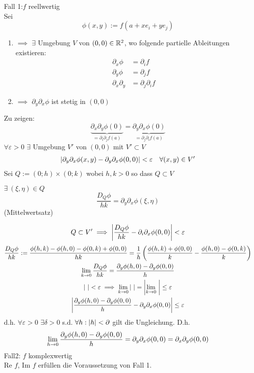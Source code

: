 \begin{Bew}
  Fall 1:$f$ reellwertig\\
  Sei 
  \[\phi(x,y):=f(a+xe_i+ye_j)\]
  \begin{enumerate}
    \item $\implies$ $\exists$ Umgebung $V$ von $(0,0)\in\mathbb{R}^2$, wo folgende partielle Ableitungen existieren:
      \begin{align*}
        \partial_x\phi&=\partial_if\\
        \partial_y\phi&=\partial_jf\\
        \partial_x\partial_y&=\partial_j\partial_if
      \end{align*}
    \item $\implies$ $\partial_y\partial_x\phi$ ist stetig in $(0,0)$
  \end{enumerate}
  Zu zeigen:
  \[\underbrace{\partial_x\partial_y\phi(0)}_{=\partial_i\partial_jf(a)}=\underbrace{\partial_y\partial_x\phi(0)}_{=\partial_j\partial_if(a)}\]
  $\forall \varepsilon >0$ $\exists$ Umgebung $V'$ von $(0,0)$ mit $V'\subset V$
  \begin{align*}
    \left| \partial_y\partial_x\phi(x,y)-\partial_y\partial_x\phi(0,0) \right|<\varepsilon &&\forall (x,y)\in V'
  \end{align*}
  Sei $Q:=\left( 0;h \right)\times\left( 0;k \right)$ wobei $h,k>0$ so dass $Q\subset V$
  \begin{Lem}
    $\exists\ (\xi,\eta)\in Q$
    \[\frac{D_Q\phi}{hk}=\partial_y\partial_x\phi(\xi,\eta)\]
    (Mittelwertsatz)
  \end{Lem}
  \begin{gather*}
    Q\subset V'\implies\left| \frac{D_Q\phi}{hk}-\partial_i\partial_x\phi(0,0) \right|<\varepsilon
  \end{gather*}
  \begin{gather*}
    \frac{D_Q\phi}{hk}:=\frac{\phi(h,k)-\phi(h,0)-\phi(0,k)+\phi(0,0)}{hk}=\frac{1}{h}\left( \frac{ \phi(h,k)+\phi(0,0)}{k}-\frac{\phi(h,0)-\phi(0,k)}{k}\right)\\
    \displaystyle\lim_{k\rightarrow0}\frac{D_Q\phi}{hk}=\frac{\partial_y\phi(h,0)-\partial_y\phi(0,0)}{h}\\
    \left| \  \right|<\varepsilon\implies\displaystyle\lim_{k\rightarrow0}\left| \  \right|=\left| \displaystyle\lim_{k\rightarrow0}\  \right|\leq \varepsilon\\
    \left| \frac{\partial_y\phi(h,0)-\partial_y\phi(0,0)}{h}-\partial_y\partial_x\phi(0,0) \right|\leq \varepsilon
  \end{gather*}
  d.h. $\forall\varepsilon>0$ $\exists \delta>0$ s.d. $\forall h:\left| h \right|<\partial$ gilt die Ungleichung. D.h.
  \[\displaystyle\lim_{h\rightarrow0}\frac{\partial_y\phi(h,0)-\partial_y\phi(0,0)}{h}=\partial_y\partial_x\phi(0,0)=\partial_x\partial_y\phi(0,0)\]
  Fall2: $f$ komplexwertig\\
  Re $f$, Im $f$ erfüllen die Voraussetzung von Fall 1.
\end{Bew}
